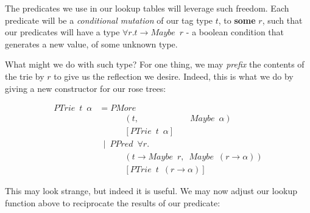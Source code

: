 \documentclass[twoside]{article}
\begin{document}
\begin{multicols}{2}
The predicates we use in our lookup tables will leverage such freedom. Each
predicate will be a \textit{conditional mutation} of our tag type \(t\),
to \textbf{some} \(r\),
such that our predicates will have a type \(\forall r. t \rightarrow Maybe \enspace r\) -
a boolean condition that generates a new value, of some unknown type.

What might we do with such type? For one thing, we may \textit{prefix} the contents
of the trie by \(r\) to give us the reflection we desire. Indeed, this is what we do by giving
a new constructor for our rose trees:

\begin{align*}
PTrie \enspace t \enspace \alpha &= PMore \\
                                 & \quad \quad \quad (t,\quad \quad \quad \quad \quad \quad Maybe \enspace \alpha) \\
                                 & \quad \quad \quad [PTrie \enspace t \enspace \alpha] \\
                                 & \enspace | \enspace PPred \enspace \forall r. \\
                                 & \quad \quad \quad (t \rightarrow Maybe \enspace r, \enspace Maybe \enspace (r \rightarrow \alpha))\\
                                 & \quad \quad \quad [PTrie \enspace t \enspace (r \rightarrow \alpha)]
\end{align*}

This may look strange, but indeed it is useful. We may now adjust our lookup
function above to reciprocate the results of our predicate:


\end{multicols}
\end{document}
